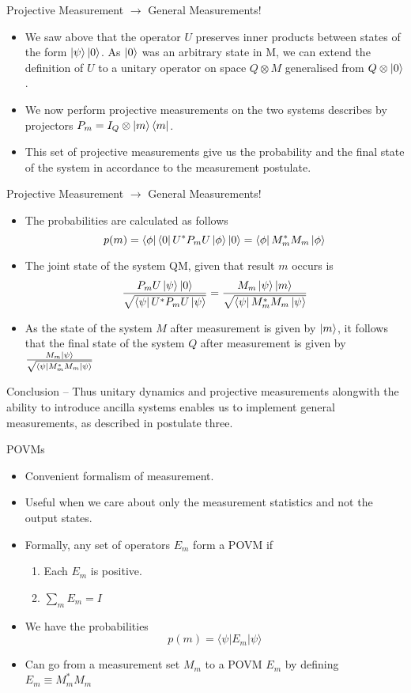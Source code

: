 \documentclass[handout]{beamer}
\begin{document}
\begin{frame}{Projective Measurement $
\to$ General Measurements!}
\begin{itemize}
    \item We saw above that the operator $U$ preserves inner products between states of the form $\ket{\psi}\ket{0}$. As $\ket{0}$ was an arbitrary state in M, we can extend the definition of $U$ to a unitary operator on space $Q \otimes M$ generalised from $Q \otimes \ket{0}$.\pause 
    \item We now perform projective measurements on the two systems describes by projectors $P_m= I_Q \otimes \ket{m} \bra{m}$.\pause 
    \item This set of projective measurements give us the probability and the final state of the system in accordance to the measurement postulate.
\end{itemize}
\end{frame}

\begin{frame}{Projective Measurement $
\to$ General Measurements!}
    \begin{itemize}
        \item The probabilities are calculated as follows \[p(m)= \bra{\phi}\bra{0}U^* P_m U \ket{\phi}\ket{0} = \bra{\phi} M_m^* M_m \ket{\phi} \]\pause 
        \item The joint state of the system QM, given that result $m$ occurs is \[\frac{P_m U \ket{\psi}\ket{0}}{\sqrt{\bra{\psi}U^* P_m U \ket{\psi}}} = \frac{M_m \ket{\psi} \ket{m}}{\sqrt{\bra{\psi}M_m^* M_m \ket{\psi}}}\]\pause 
        \item As the state of the system $M$ after measurement is given by $\ket{m}$, it follows that the final state of the system $Q$ after measurement is given by $\frac{M_m \ket{\psi}}{\sqrt{\bra{\psi}M_m^* M_m \ket{\psi}}}$\pause 
    \end{itemize}
    
    Conclusion -- Thus unitary dynamics and projective measurements alongwith the ability to introduce ancilla systems enables us to implement general measurements, as described in postulate three.
\end{frame}
\begin{frame}{POVMs}
\begin{itemize}
\item Convenient formalism of measurement.\pause
\item Useful when we care about only the measurement statistics and not the output states.\pause
\item Formally, any set of operators $E_m$ form a POVM if \pause
\begin{enumerate}
\item Each $E_m$ is positive.\pause
\item $\sum_m E_m = I$\pause
\end{enumerate}
\item We have the probabilities\pause
\[p(m) = \langle\psi|E_m|\psi\rangle\]\pause
\item Can go from a measurement set $M_m$ to a POVM $E_m$ by defining $E_m \equiv M_m^*M_m$
\end{itemize}
\end{frame}
\end{document}

